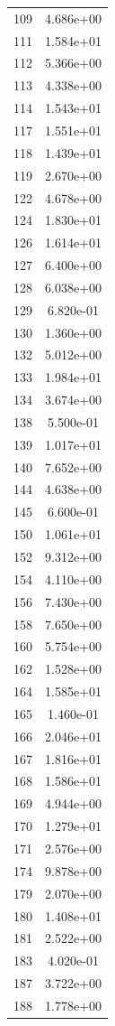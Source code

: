 \documentclass[12pt]{article}
\begin{document}
\begin{longtable}{@{}cc@{}}
109 & 4.686e+00 \\
111 & 1.584e+01 \\
112 & 5.366e+00 \\
113 & 4.338e+00 \\
114 & 1.543e+01 \\
117 & 1.551e+01 \\
118 & 1.439e+01 \\
119 & 2.670e+00 \\
122 & 4.678e+00 \\
124 & 1.830e+01 \\
126 & 1.614e+01 \\
127 & 6.400e+00 \\
128 & 6.038e+00 \\
129 & 6.820e-01 \\
130 & 1.360e+00 \\
132 & 5.012e+00 \\
133 & 1.984e+01 \\
134 & 3.674e+00 \\
138 & 5.500e-01 \\
139 & 1.017e+01 \\
140 & 7.652e+00 \\
144 & 4.638e+00 \\
145 & 6.600e-01 \\
150 & 1.061e+01 \\
152 & 9.312e+00 \\
154 & 4.110e+00 \\
156 & 7.430e+00 \\
158 & 7.650e+00 \\
160 & 5.754e+00 \\
162 & 1.528e+00 \\
164 & 1.585e+01 \\
165 & 1.460e-01 \\
166 & 2.046e+01 \\
167 & 1.816e+01 \\
168 & 1.586e+01 \\
169 & 4.944e+00 \\
170 & 1.279e+01 \\
171 & 2.576e+00 \\
174 & 9.878e+00 \\
179 & 2.070e+00 \\
180 & 1.408e+01 \\
181 & 2.522e+00 \\
183 & 4.020e-01 \\
187 & 3.722e+00 \\
188 & 1.778e+00 \\

\end{longtable}
\end{document}
